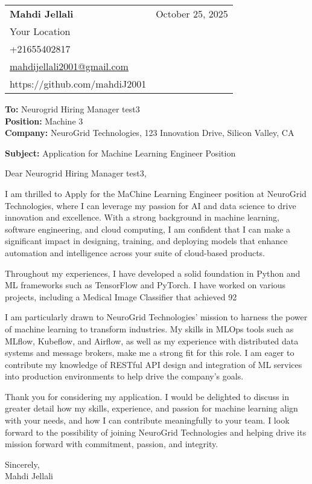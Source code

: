 \documentclass[letterpaper,11pt]{article}
\makeatletter
\newcommand{\letterHeading}[5]{
    \begin{tabular*}{\textwidth}{l@{\extracolsep{\fill}}r}
    \textbf{\Large #1} & #5 \\  %
    #2 & \\
    #3 & \\
    #4 & \\
    \end{tabular*}
    \vspace{15pt}
}
\newcommand{\letterRecipient}[3]{
    \textbf{\large To:} #1 \\
    \textbf{\large Position:} #2 \\
    \textbf{\large Company:} #3 \\
    \vspace{12pt}
}
\newcommand{\letterSubject}[1]{
    \textbf{\large Subject:} #1 \\
    \vspace{15pt}
}
\makeatother
\begin{document}
    \letterHeading
    {Mahdi Jellali}
    {Your Location}
    {+21655402817 \\ \href{mailto:mahdijellali2001@gmail.com}{mahdijellali2001@gmail.com}}
    {https://github.com/mahdiJ2001}
    {October 25, 2025}

    \letterRecipient
    {Neurogrid Hiring Manager test3}
    {Machine 3}
    {NeuroGrid Technologies, 123 Innovation Drive, Silicon Valley, CA}

    \letterSubject{Application for Machine Learning Engineer Position}

    Dear Neurogrid Hiring Manager test3,

    I am thrilled to Apply for the MaChine Learning Engineer position at NeuroGrid Technologies, where I can leverage my passion for AI and data science to drive innovation and excellence. With a strong background in machine learning, software engineering, and cloud computing, I am confident that I can make a significant impact in designing, training, and deploying models that enhance automation and intelligence across your suite of cloud-based products.

    Throughout my experiences, I have developed a solid foundation in Python and ML frameworks such as TensorFlow and PyTorch. I have worked on various projects, including a Medical Image Classifier that achieved 92%

    I am particularly drawn to NeuroGrid Technologies' mission to harness the power of machine learning to transform industries. My skills in MLOps tools such as MLflow, Kubeflow, and Airflow, as well as my experience with distributed data systems and message brokers, make me a strong fit for this role. I am eager to contribute my knowledge of RESTful API design and integration of ML services into production environments to help drive the company's goals.

    Thank you for considering my application. I would be delighted to discuss in greater detail how my skills, experience, and passion for machine learning align with your needs, and how I can contribute meaningfully to your team. I look forward to the possibility of joining NeuroGrid Technologies and helping drive its mission forward with commitment, passion, and integrity.

    Sincerely,\\[12pt]

    Mahdi Jellali
\end{document}
